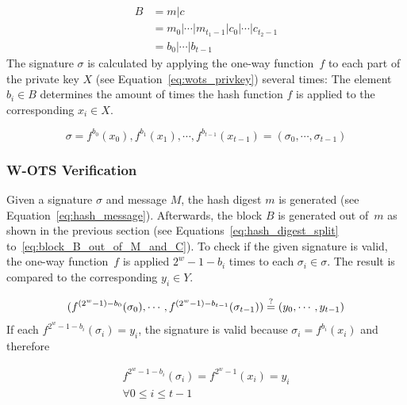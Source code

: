 \begin{align}
\label{eq:block_B_out_of_M_and_C}
B &= m | c  \\ 
&= m_0 | \cdots | m_{t_1 - 1} | c_0 | \cdots | c_{t_2 - 1} \nonumber \\
&= b_0 | \cdots | b_{t-1} \nonumber
\end{align}
The signature $\sigma$ is calculated by applying the one-way function~$f$ to each part of the private key $X$ (see Equation~\ref{eq:wots_privkey}) several times: The element $b_i \in B$ determines the amount of times the hash function $f$ is applied to the corresponding $x_i \in X$.

\begin{equation}
\sigma = f^{b_0}(x_0), f^{b_1}(x_1), \cdots, f^{b_{t-1}}(x_{t-1}) = (\sigma_0, \cdots, \sigma_{t-1})
\end{equation}

\subsubsection{W-OTS Verification}
Given a signature $\sigma$ and message $M$, the hash digest $m$ is generated (see Equation~\ref{eq:hash_message}). Afterwards, the block $B$ is generated out of~$m$ as shown in the previous section (see Equations~\ref{eq:hash_digest_split} to~\ref{eq:block_B_out_of_M_and_C}). To check if the given signature is valid, the one-way function~$f$ is applied $2^w - 1 - b_i$ times to each $\sigma_i \in \sigma$. The result is compared to the corresponding $y_i \in Y$.

\begin{equation}
(f^{(2^w-1)-b_0}(\sigma_0), \cdots, f^{(2^w - 1) - b_{t-1}}(\sigma_{t-1})) \stackrel{?}{=} (y_0, \cdots, y_{t-1})
\end{equation}
If each $f^{2^w-1-b_i}(\sigma_i) = y_i$, the signature is valid because $\sigma_i = f^{b_i}(x_i)$ and therefore

\begin{gather}
f^{2^w-1-b_i}(\sigma_i) = f^{2^w-1}(x_i) = y_i \\
\forall 0 \leq i \leq t-1 \nonumber
\end{gather}



